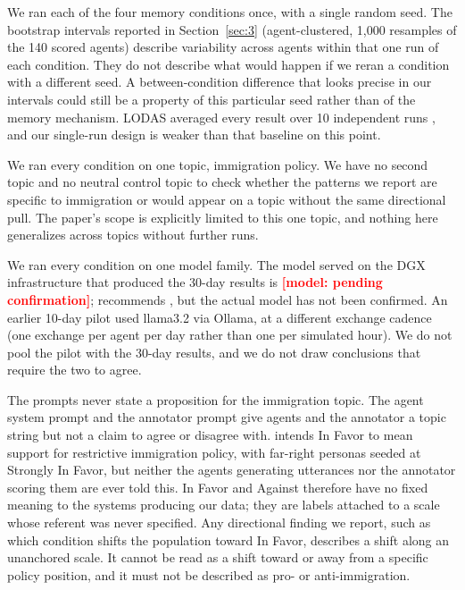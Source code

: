 \documentclass[11pt,a4paper]{article}
\newcommand{\pending}[1]{\textcolor{red}{\textbf{[#1]}}}
\begin{document}
We ran each of the four memory conditions once, with a single random seed. The bootstrap intervals reported in Section~\ref{sec:3} (agent-clustered, 1,000 resamples of the 140 scored agents) describe variability across agents within that one run of each condition. They do not describe what would happen if we reran a condition with a different seed. A between-condition difference that looks precise in our intervals could still be a property of this particular seed rather than of the memory mechanism. LODAS averaged every result over 10 independent runs \citep{cau2025selective}, and our single-run design is weaker than that baseline on this point.

We ran every condition on one topic, immigration policy. We have no second topic and no neutral control topic to check whether the patterns we report are specific to immigration or would appear on a topic without the same directional pull. The paper's scope is explicitly limited to this one topic, and nothing here generalizes across topics without further runs.

We ran every condition on one model family. The model served on the DGX infrastructure that produced the 30-day results is \pending{model: pending confirmation};  recommends , but the actual model has not been confirmed. An earlier 10-day pilot used llama3.2 via Ollama, at a different exchange cadence (one exchange per agent per day rather than one per simulated hour). We do not pool the pilot with the 30-day results, and we do not draw conclusions that require the two to agree.

The prompts never state a proposition for the immigration topic. The agent system prompt and the annotator prompt give agents and the annotator a topic string but not a claim to agree or disagree with.  intends In Favor to mean support for restrictive immigration policy, with far-right personas seeded at Strongly In Favor, but neither the agents generating utterances nor the annotator scoring them are ever told this. In Favor and Against therefore have no fixed meaning to the systems producing our data; they are labels attached to a scale whose referent was never specified. Any directional finding we report, such as which condition shifts the population toward In Favor, describes a shift along an unanchored scale. It cannot be read as a shift toward or away from a specific policy position, and it must not be described as pro- or anti-immigration.
\end{document}
